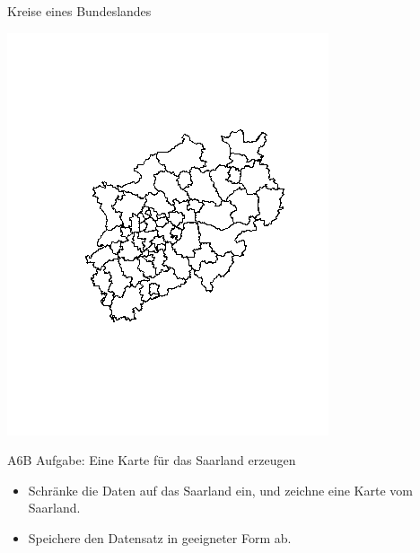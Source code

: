 \documentclass[ignorenonframetext,]{beamer}
\newenvironment{Shaded}{\begin{snugshade}}{\end{snugshade}}
\newcommand{\DecValTok}[1]{\textcolor[rgb]{0.00,0.00,0.81}{#1}}
\newcommand{\KeywordTok}[1]{\textcolor[rgb]{0.13,0.29,0.53}{\textbf{#1}}}
\newcommand{\NormalTok}[1]{#1}
\newcommand{\OperatorTok}[1]{\textcolor[rgb]{0.81,0.36,0.00}{\textbf{#1}}}
\newcommand{\StringTok}[1]{\textcolor[rgb]{0.31,0.60,0.02}{#1}}
\begin{document}
\begin{frame}[fragile]{Kreise eines Bundeslandes}
\protect\hypertarget{kreise-eines-bundeslandes}{}

\begin{Shaded}
\end{Shaded}

\includegraphics{figure/KreiseNRW.png}

\end{frame}

\begin{frame}{A6B Aufgabe: Eine Karte für das Saarland erzeugen}
\protect\hypertarget{a6b-aufgabe-eine-karte-fur-das-saarland-erzeugen}{}

\begin{itemize}
\item
  Schränke die Daten auf das Saarland ein, und zeichne eine Karte vom
  Saarland.
\item
  Speichere den Datensatz in geeigneter Form ab.
\end{itemize}

\end{frame}
\end{document}
